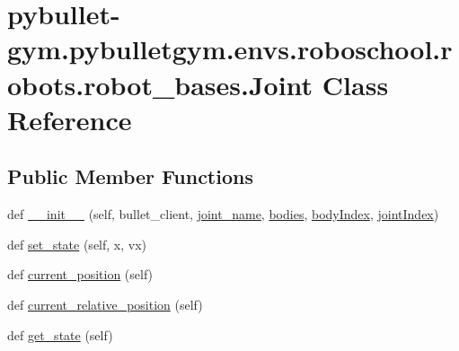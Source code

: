 \hypertarget{classpybullet-gym_1_1pybulletgym_1_1envs_1_1roboschool_1_1robots_1_1robot__bases_1_1_joint}{}\section{pybullet-\/gym.pybulletgym.\+envs.\+roboschool.\+robots.\+robot\+\_\+bases.\+Joint Class Reference}
\label{classpybullet-gym_1_1pybulletgym_1_1envs_1_1roboschool_1_1robots_1_1robot__bases_1_1_joint}
\subsection*{Public Member Functions}
\begin{DoxyCompactItemize}
\item 
def \hyperlink{classpybullet-gym_1_1pybulletgym_1_1envs_1_1roboschool_1_1robots_1_1robot__bases_1_1_joint_a6e7922f01d15a69b3538fbf2789eae94}{\+\_\+\+\_\+init\+\_\+\+\_\+} (self, bullet\+\_\+client, \hyperlink{classpybullet-gym_1_1pybulletgym_1_1envs_1_1roboschool_1_1robots_1_1robot__bases_1_1_joint_abea9b90e5fbff4abb31b0ae67d563c25}{joint\+\_\+name}, \hyperlink{classpybullet-gym_1_1pybulletgym_1_1envs_1_1roboschool_1_1robots_1_1robot__bases_1_1_joint_a29c3f1a74fbbcaa64820579d5bc99341}{bodies}, \hyperlink{classpybullet-gym_1_1pybulletgym_1_1envs_1_1roboschool_1_1robots_1_1robot__bases_1_1_joint_a546e049d5f18141dbbe2631bb547ebec}{body\+Index}, \hyperlink{classpybullet-gym_1_1pybulletgym_1_1envs_1_1roboschool_1_1robots_1_1robot__bases_1_1_joint_ae2ba235fa4fb013c054f213a3149694a}{joint\+Index})
\item 
def \hyperlink{classpybullet-gym_1_1pybulletgym_1_1envs_1_1roboschool_1_1robots_1_1robot__bases_1_1_joint_aed905c378e48c97e6d4dcdf956f16025}{set\+\_\+state} (self, x, vx)
\item 
def \hyperlink{classpybullet-gym_1_1pybulletgym_1_1envs_1_1roboschool_1_1robots_1_1robot__bases_1_1_joint_ac7436aa11c9d9b3a5e076c8d7b012c7f}{current\+\_\+position} (self)
\item 
def \hyperlink{classpybullet-gym_1_1pybulletgym_1_1envs_1_1roboschool_1_1robots_1_1robot__bases_1_1_joint_addff7cc1f56aa12d45dfcbd63328b5c1}{current\+\_\+relative\+\_\+position} (self)
\item 
def \hyperlink{classpybullet-gym_1_1pybulletgym_1_1envs_1_1roboschool_1_1robots_1_1robot__bases_1_1_joint_a0e4994bb05c8bfb7e53f31cb02cedc82}{get\+\_\+state} (self)

\end{DoxyCompactItemize}
